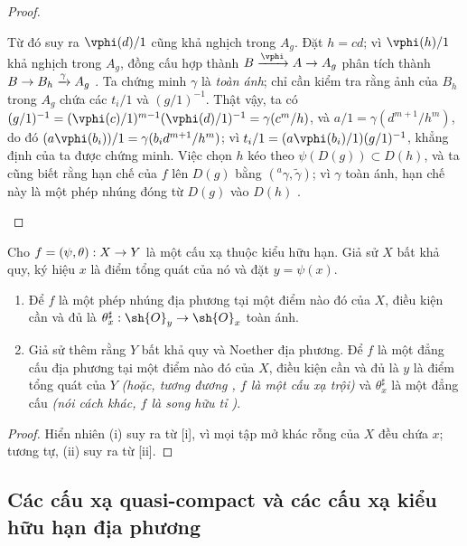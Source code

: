 \documentclass[oneside]{amsart}
\makeatletter
\newcommand{\ega@arrow}[2]{\mathchoice{#1}{#2}{#2}{#2}}
\renewcommand{\to}{\ega@arrow{\longrightarrow}{\rightarrow}}
\let\EGAOriginalLabel\label
\renewcommand{\label}[1]{\phantomsection\EGAOriginalLabel{#1}}
\makeatother
\begin{document}
\begin{proof}
\begin{enumerate}
    Từ đó suy ra $\vphi(d)/1$ cũng khả nghịch trong $A_g$.
    Đặt $h=cd$;
    vì $\vphi(h)/1$ khả nghịch trong $A_g$, đồng cấu hợp thành $B\xrightarrow{\vphi}A\to A_g$ phân tích thành $B\to B_h\xrightarrow{\gamma}A_g$ .
    Ta chứng minh $\gamma$ là \emph{toàn ánh};
    chỉ cần kiểm tra rằng ảnh của $B_h$ trong $A_g$ chứa các $t_i/1$ và $(g/1)^{-1}$.
    Thật vậy, ta có $(g/1)^{-1}=(\vphi(c)/1)^{m-1}(\vphi(d)/1)^{-1}=\gamma(c^m/h)$, và $a/1=\gamma(d^{m+1}/h^m)$, do đó $(a\vphi(b_i))/1=\gamma(b_id^{m+1}/h^m)$; vì $t_i/1=(a\vphi(b_i)/1)(g/1)^{-1}$, khẳng định của ta được chứng minh.
    Việc chọn $h$ kéo theo $\psi(D(g))\subset D(h)$, và ta cũng biết rằng hạn chế của $f$ lên $D(g)$ bằng $({}^a\gamma,\widetilde{\gamma})$;
    vì $\gamma$ toàn ánh, hạn chế này là một phép nhúng đóng từ $D(g)$ vào $D(h)$ .
\end{enumerate}
\end{proof}

\begin{corollary}[6.5.5]
\label{I.6.5.5}
Cho $f=(\psi,\theta):X\to Y$ là một cấu xạ thuộc kiểu hữu hạn.
Giả sử $X$ bất khả quy, ký hiệu $x$ là điểm tổng quát của nó và đặt $y=\psi(x)$.
\begin{enumerate}
  \item[{\rm(i)}] Để $f$ là một phép nhúng địa phương tại một điểm nào đó của $X$, điều kiện cần và đủ là $\theta_x^\sharp:\sh{O}_y\to\sh{O}_x$ toàn ánh.
  \item[{\rm(ii)}] Giả sử thêm rằng $Y$ bất khả quy và Noether địa phương.
    Để $f$ là một đẳng cấu địa phương tại một điểm nào đó của $X$, điều kiện cần và đủ là $y$ là điểm tổng quát của $Y$ \emph{(hoặc, tương đương , $f$ là một cấu xạ \emph{trội})} và $\theta_x^\sharp$ là một đẳng cấu \emph{(nói cách khác, $f$ là \emph{song hữu tỉ} )}.
\end{enumerate}
\end{corollary}

\begin{proof}
Hiển nhiên (i) suy ra từ [i], vì mọi tập mở khác rỗng của $X$ đều chứa $x$;
tương tự, (ii) suy ra từ [ii].
\end{proof}

\subsection{Các cấu xạ quasi-compact và các cấu xạ kiểu hữu hạn địa phương}
\label{subsection:I.6.6}
\end{document}
